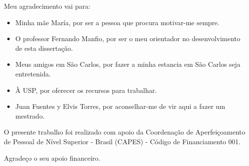 %
Meu agradecimento vai para:
\begin{itemize}
	\item Minha mãe María, por ser a pessoa que procura motivar-me sempre.
	\item O professor Fernando Manfio, por ser o meu orientador no desenvolvimento de esta dissertação.
	\item Meus amigos em São Carlos, por fazer a minha estancia em São Carlos seja entretenida.
	\item À USP, por oferecer os recursos para trabalhar.
	\item Juan Fuentes y Elvis Torres, por aconselhar-me de vir aqui a fazer um mestrado.
\end{itemize}

O presente trabalho foi realizado com apoio da Coordenação de Aperfeiçoamento
de Pessoal de Nível Superior - Brasil (CAPES) - Código de Financiamento 001.

Agradeço o seu apoio financeiro.